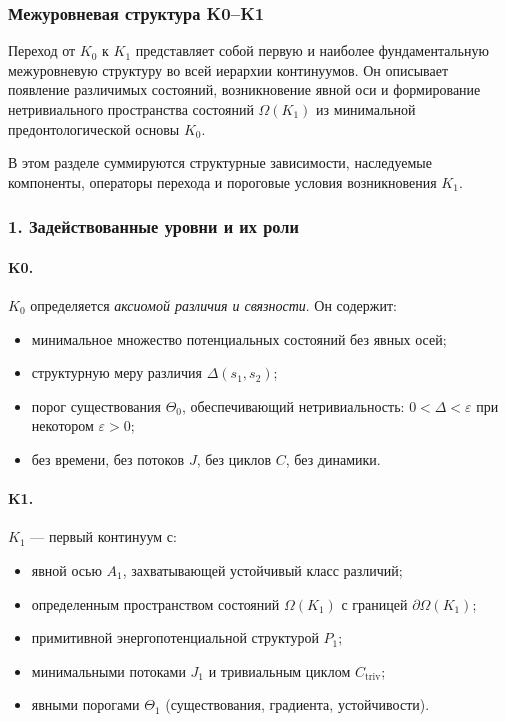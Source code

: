 
\subsubsection{Межуровневая структура K0–K1}
\label{sec:crossk-k0-k1}

Переход от $K_0$ к $K_1$ представляет собой первую и наиболее фундаментальную
межуровневую структуру во всей иерархии континуумов. Он описывает
появление различимых состояний, возникновение явной оси и формирование
нетривиального пространства состояний $\Omega(K_1)$ из минимальной
предонтологической основы $K_0$.

В этом разделе суммируются структурные зависимости, наследуемые компоненты,
операторы перехода и пороговые условия возникновения $K_1$.

\subsubsection{1. Задействованные уровни и их роли}

\paragraph{K0.}
$K_0$ определяется \emph{аксиомой различия и связности}.
Он содержит:
\begin{itemize}
  \item минимальное множество потенциальных состояний без явных осей;
  \item структурную меру различия $\Delta(s_1,s_2)$;
  \item порог существования $\Theta_0$, обеспечивающий нетривиальность:
        $0 < \Delta < \varepsilon$ при некотором $\varepsilon>0$;
  \item без времени, без потоков $J$, без циклов $C$, без динамики.
\end{itemize}

\paragraph{K1.}
$K_1$ — первый континуум с:
\begin{itemize}
  \item явной осью $A_1$, захватывающей устойчивый класс различий;
  \item определенным пространством состояний $\Omega(K_1)$ с границей
        $\partial\Omega(K_1)$;
  \item примитивной энергопотенциальной структурой $P_1$;
  \item минимальными потоками $J_1$ и тривиальным циклом
        $C_{\mathrm{triv}}$;
  \item явными порогами $\Theta_1$ (существования, градиента, устойчивости).
\end{itemize}

